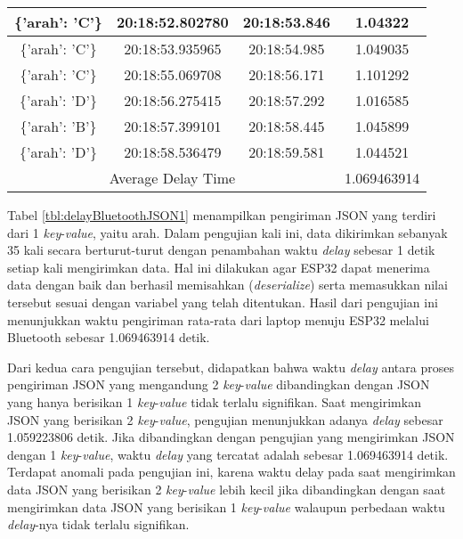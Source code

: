 \begin{longtable}{|ccc|c|}
    \multicolumn{1}{|c|}{\{'arah': 'C'\}} & \multicolumn{1}{c|}{20:18:52.802780} & 20:18:53.846       & 1.04322     \\ \hline
    \multicolumn{1}{|c|}{\{'arah': 'C'\}} & \multicolumn{1}{c|}{20:18:53.935965} & 20:18:54.985       & 1.049035    \\ \hline
    \multicolumn{1}{|c|}{\{'arah': 'C'\}} & \multicolumn{1}{c|}{20:18:55.069708} & 20:18:56.171       & 1.101292    \\ \hline
    \multicolumn{1}{|c|}{\{'arah': 'D'\}} & \multicolumn{1}{c|}{20:18:56.275415} & 20:18:57.292       & 1.016585    \\ \hline
    \multicolumn{1}{|c|}{\{'arah': 'B'\}} & \multicolumn{1}{c|}{20:18:57.399101} & 20:18:58.445       & 1.045899    \\ \hline
    \multicolumn{1}{|c|}{\{'arah': 'D'\}} & \multicolumn{1}{c|}{20:18:58.536479} & 20:18:59.581       & 1.044521    \\ \hline
    \multicolumn{3}{|c|}{Average Delay Time}                                                          & 1.069463914 \\ \hline
\end{longtable}

Tabel \ref{tbl:delayBluetoothJSON1} menampilkan pengiriman JSON yang terdiri dari 1 \emph{key}-\emph{value}, yaitu arah. Dalam pengujian kali ini, data dikirimkan sebanyak 35 kali secara berturut-turut dengan penambahan waktu \emph{delay} sebesar 1 detik setiap kali mengirimkan data. Hal ini dilakukan agar ESP32 dapat menerima data dengan baik dan berhasil memisahkan (\emph{deserialize}) serta memasukkan nilai tersebut sesuai dengan variabel yang telah ditentukan. Hasil dari pengujian ini menunjukkan waktu pengiriman rata-rata dari laptop menuju ESP32 melalui Bluetooth sebesar 1.069463914 detik.

Dari kedua cara pengujian tersebut, didapatkan bahwa waktu \emph{delay} antara proses pengiriman JSON yang mengandung 2 \emph{key}-\emph{value} dibandingkan dengan JSON yang hanya berisikan 1 \emph{key}-\emph{value} tidak terlalu signifikan. Saat mengirimkan JSON yang berisikan 2 \emph{key}-\emph{value}, pengujian menunjukkan adanya \emph{delay} sebesar 1.059223806 detik. Jika dibandingkan dengan pengujian yang mengirimkan JSON dengan 1 \emph{key}-\emph{value}, waktu \emph{delay} yang tercatat adalah sebesar 1.069463914 detik. Terdapat anomali pada pengujian ini, karena waktu delay pada saat mengirimkan data JSON yang berisikan 2 \emph{key}-\emph{value} lebih kecil jika dibandingkan dengan saat mengirimkan data JSON yang berisikan 1 \emph{key}-\emph{value} walaupun perbedaan waktu \emph{delay}-nya tidak terlalu signifikan.

